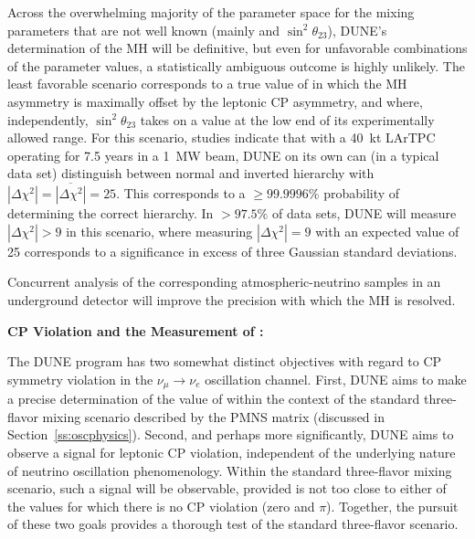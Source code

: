 Across the overwhelming majority of the parameter space for the mixing
parameters that are not well known (mainly \deltacp and
$\sin^2{\theta_{23}}$), DUNE's determination of the MH will be
definitive, but even for unfavorable combinations of the parameter
values, a statistically ambiguous outcome is highly unlikely.
The least favorable scenario corresponds to a true value of \deltacp
in which the MH asymmetry is maximally offset by the leptonic CP
asymmetry, and where, independently, $\sin^2{\theta_{23}}$ takes on a
value at the low end of its experimentally allowed range.  For
this %
scenario, studies indicate that with a 40~kt %
LArTPC operating for %
7.5 years in a 1~MW beam, DUNE on its own can (in a typical data set)
distinguish between normal and inverted hierarchy with $|\Delta
\chi^2| = \overline{|\Delta \chi^2|} = 25$. This corresponds to a
$\geq 99.9996\%$ probability of determining the correct hierarchy.  In
$>97.5\%$ of data sets, DUNE will measure $|\Delta \chi^2| > 9$ in
this scenario, where measuring $|\Delta\chi^2| = 9$ with an expected
value of \num{25} corresponds to a significance in excess of three
Gaussian standard deviations.

Concurrent analysis of the corresponding atmospheric-neutrino samples
in an underground detector will improve the precision with which the
MH is resolved.  


\textbf{CP Violation and the Measurement of {\boldmath \deltacp}:}

The DUNE program has two somewhat distinct objectives with regard to
CP symmetry violation in the $\nu_\mu \to \nu_e$ oscillation channel.
First, DUNE aims to make a precise determination of the value of
\deltacp within the context of the standard three-flavor mixing
scenario described by the PMNS matrix (discussed in
Section~\ref{ss:oscphysics}).  Second, and perhaps more significantly,
DUNE aims to observe a signal for leptonic CP violation, independent
of the underlying nature of neutrino oscillation phenomenology.
Within the standard three-flavor mixing scenario, such a signal will
be observable, provided \deltacp is not too close to either of the
values for which there is no CP violation (zero and $\pi$).  Together,
the pursuit of these two goals provides a thorough test of the
standard three-flavor scenario.

